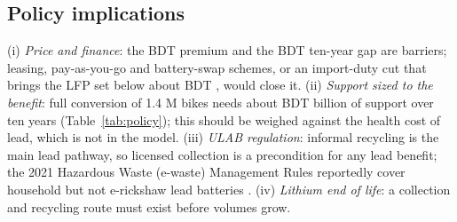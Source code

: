 \subsection{Policy implications}
(i) \emph{Price and finance}: the BDT \premium{} premium and the BDT \gapLFP{} ten-year gap are barriers; leasing, pay-as-you-go and battery-swap schemes, or an import-duty cut that brings the LFP set below about BDT \beP{}, would close it. (ii) \emph{Support sized to the benefit}: full conversion of 1.4 M bikes needs about BDT \suppFull{} billion of support over ten years (Table~\ref{tab:policy}); this should be weighed against the health cost of lead, which is not in the model. (iii) \emph{ULAB regulation}: informal recycling is the main lead pathway, so licensed collection is a precondition for any lead benefit; the 2021 Hazardous Waste (e-waste) Management Rules reportedly cover household but not e-rickshaw lead batteries \cite{smep2024}. (iv) \emph{Lithium end of life}: a collection and recycling route must exist before volumes grow.

